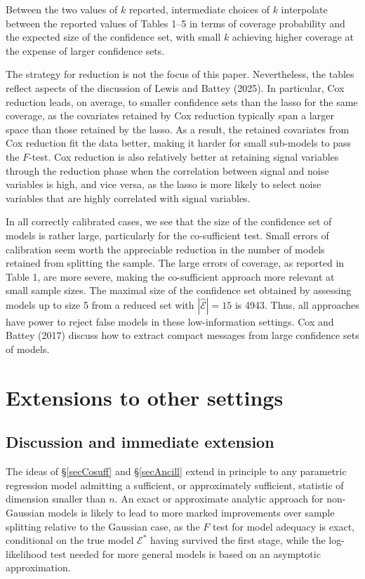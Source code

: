 \documentclass[10pt, reqno]{amsart}
\numberwithin{equation}{section}
\begin{document}
Between the two values of $k$ reported, intermediate choices of $k$ interpolate between the reported values of Tables 1--5 in terms of coverage probability and the expected size of the confidence set, with small $k$ achieving higher coverage at the expense of larger confidence sets.

The strategy for reduction is not the focus of this paper. Nevertheless, the tables reflect aspects of the discussion of Lewis and Battey (2025). In particular, Cox reduction leads, on average, to smaller confidence sets than the lasso for the same coverage, as the covariates retained by Cox reduction typically span a larger space than those retained by the lasso. As a result, the retained covariates from Cox reduction fit the data better, making it harder for small sub-models to pass the $F$-test. Cox reduction is also relatively better at retaining signal variables through the reduction phase when the correlation between signal and noise variables is high, and vice versa, as the lasso is more likely to select noise variables that are highly correlated with signal variables. 

In all correctly calibrated cases, we see that the size of the confidence set of models is rather large, particularly for the co-sufficient test. Small errors of calibration seem worth the appreciable reduction in the number of models retained from splitting the sample. The large errors of coverage, as reported in Table 1, are more severe, making the co-sufficient approach more relevant at small sample sizes. The maximal size of the confidence set obtained by assessing models up to size 5 from a reduced set with $|\hat{\mathcal{E}}|=15$ is 4943. Thus, all approaches have power to reject false models in these low-information settings. Cox and Battey (2017) discuss how to extract compact messages from large confidence sets of models.



\section{Extensions to other settings}\label{secExtension}

\subsection{Discussion and immediate extension}

The ideas of \S \ref{secCosuff} and \S \ref{secAncill} extend in principle to any parametric regression model admitting a sufficient, or approximately sufficient, statistic of dimension smaller than $n$. An exact or approximate analytic approach for non-Gaussian models is likely to lead to more marked improvements over sample splitting relative to the Gaussian case, as the $F$ test for model adequacy  is exact, conditional on the true model $\mathcal{E}^*$ having survived the first stage, while the log-likelihood test needed for more general models is based on an asymptotic approximation.
\end{document}
